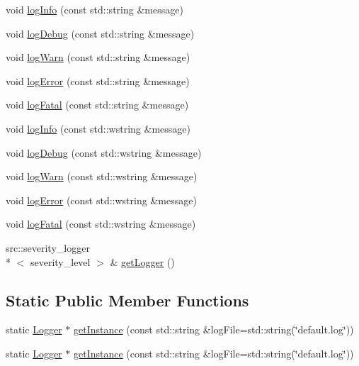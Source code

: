 \begin{DoxyCompactItemize}
\item 
void \hyperlink{classcs__logger_1_1Logger_a2a4a2fa412e2a4cd169575fc756dd7c2}{log\-Info} (const std\-::string \&message)
\item 
void \hyperlink{classcs__logger_1_1Logger_a88b308f014615232282d0685681c3b79}{log\-Debug} (const std\-::string \&message)
\item 
void \hyperlink{classcs__logger_1_1Logger_a6da2c794e37af6cbab66c38739ec823c}{log\-Warn} (const std\-::string \&message)
\item 
void \hyperlink{classcs__logger_1_1Logger_a7c52f6593865a6087d85b4a4cb0c9c42}{log\-Error} (const std\-::string \&message)
\item 
void \hyperlink{classcs__logger_1_1Logger_a7b1cd9ebd4d44a322aa42d1bb84af359}{log\-Fatal} (const std\-::string \&message)
\item 
void \hyperlink{classcs__logger_1_1Logger_aa36dd68f50aca9710b3474d54dabf805}{log\-Info} (const std\-::wstring \&message)
\item 
void \hyperlink{classcs__logger_1_1Logger_aad6514941a88221438df7f2e9e300430}{log\-Debug} (const std\-::wstring \&message)
\item 
void \hyperlink{classcs__logger_1_1Logger_a8cb8239ea1ccc4e36dbebf986ca4df7e}{log\-Warn} (const std\-::wstring \&message)
\item 
void \hyperlink{classcs__logger_1_1Logger_a48e8c5e798e323d500916ce2e0a30f69}{log\-Error} (const std\-::wstring \&message)
\item 
void \hyperlink{classcs__logger_1_1Logger_ab09103beca84bc017ffd9f2909ea50c0}{log\-Fatal} (const std\-::wstring \&message)
\item 
src\-::severity\-\_\-logger\\*
$<$ severity\-\_\-level $>$ \& \hyperlink{classcs__logger_1_1Logger_a6c54c415053dc4ef4210e4c68ce8e4c1}{get\-Logger} ()
\end{DoxyCompactItemize}
\subsection*{Static Public Member Functions}
\begin{DoxyCompactItemize}
\item 
static \hyperlink{classcs__logger_1_1Logger}{Logger} $\ast$ \hyperlink{classcs__logger_1_1Logger_aa2c38832f1cabfa134ce63d5afffbd3c}{get\-Instance} (const std\-::string \&log\-File=std\-::string(\char`\"{}default.\-log\char`\"{}))
\item 
static \hyperlink{classcs__logger_1_1Logger}{Logger} $\ast$ \hyperlink{classcs__logger_1_1Logger_a30822d029a474b5c17577dd6d9547db2}{get\-Instance} (const std\-::string \&log\-File=std\-::string(\char`\"{}default.\-log\char`\"{}))
\end{DoxyCompactItemize}


